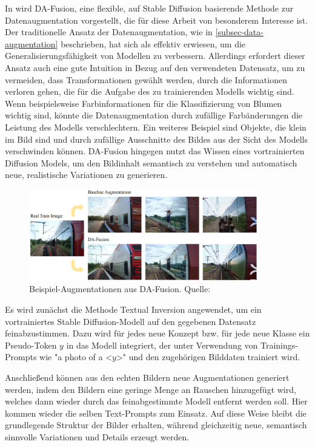 In \parencite{Trabucco2023} wird DA-Fusion, eine flexible, auf Stable Diffusion basierende Methode zur Datenaugmentation vorgestellt, die für diese Arbeit von besonderem Interesse ist. Der traditionelle Ansatz der Datenaugmentation, wie in \ref{subsec-data-augmentation} beschrieben, hat sich als effektiv erwiesen, um die Generalisierungsfähigkeit von Modellen zu verbessern. Allerdings erfordert dieser Ansatz auch eine gute Intuition in Bezug auf den verwendeten Datensatz, um zu vermeiden, dass Transformationen gewählt werden, durch die Informationen verloren gehen, die für die Aufgabe des zu trainierenden Modells wichtig sind. Wenn beispielsweise Farbinformationen für die Klassifizierung von Blumen wichtig sind, könnte die Datenaugmentation durch zufällige Farbänderungen die Leistung des Modells verschlechtern. Ein weiteres Beispiel sind Objekte, die klein im Bild sind und durch zufällige Ausschnitte des Bildes aus der Sicht des Modells verschwinden können. DA-Fusion hingegen nutzt das Wissen eines vortrainierten Diffusion Models, um den Bildinhalt semantisch zu verstehen und automatisch neue, realistische Variationen zu generieren.

\begin{figure}[h] \label{figure-da-fusion}
	\includegraphics[width=10cm]{figure_da-fusion.png}
	\caption{Beispiel-Augmentationen aus DA-Fusion. Quelle: \parencite{Trabucco2023}}
\end{figure}

Es wird zunächst die Methode Textual Inversion \parencite{} angewendet, um ein vortrainiertes Stable Diffusion-Modell auf den gegebenen Datensatz feinabzustimmen. Dazu wird für jedes neue Konzept bzw. für jede neue Klasse ein Pseudo-Token $y$ in das Modell integriert, der unter Verwendung von Trainings-Prompts wie "a photo of a <$y$>" und den zugehörigen Bilddaten trainiert wird.

Anschließend können aus den echten Bildern neue Augmentationen generiert werden, indem den Bildern eine geringe Menge an Rauschen hinzugefügt wird, welches dann wieder durch das feinabgestimmte Modell entfernt werden soll. Hier kommen wieder die selben Text-Prompts zum Einsatz. Auf diese Weise bleibt die grundlegende Struktur der Bilder erhalten, während gleichzeitig neue, semantisch sinnvolle Variationen und Details erzeugt werden.

